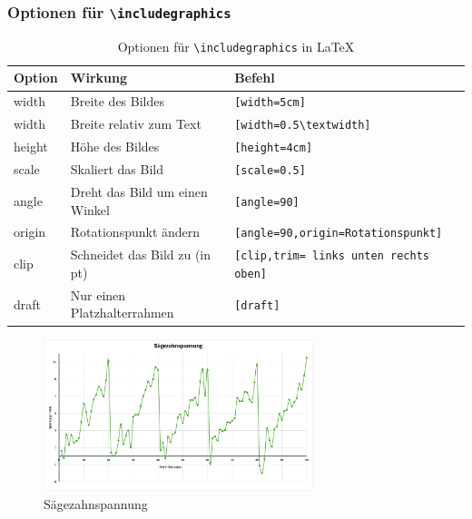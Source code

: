 \subsubsection{Optionen für \texttt{\textbackslash includegraphics}}
\begin{table}[H]
    \centering
    \begin{tabular}{lll}
        \toprule
        \textbf{Option} & \textbf{Wirkung}               & \textbf{Befehl}                               \\
        \midrule
        width           & Breite des Bildes              & \texttt{[width=5cm]}                          \\
        width           & Breite relativ zum Text        & \texttt{[width=0.5\textbackslash textwidth]}  \\
        height          & Höhe des Bildes                & \texttt{[height=4cm]}                         \\
        scale           & Skaliert das Bild              & \texttt{[scale=0.5]}                          \\
        angle           & Dreht das Bild um einen Winkel & \texttt{[angle=90]}                           \\
        origin          & Rotationspunkt ändern          & \texttt{[angle=90,origin=Rotationspunkt]}     \\
        clip            & Schneidet das Bild zu (in pt)  & \texttt{[clip,trim= links unten rechts oben]} \\
        draft           & Nur einen Platzhalterrahmen    & \texttt{[draft]}                              \\
        \bottomrule
    \end{tabular}
    \caption{Optionen für \texttt{\textbackslash includegraphics} in LaTeX}
    \label{tab:graphics_options}
\end{table}

\begin{figure}[H]
    \centering
    \includegraphics[width=0.7\textwidth]{anlagen/bilder/Graph.png}
    \caption{Sägezahnspannung}
    \label{fig:sägezahnspannung}
\end{figure}

